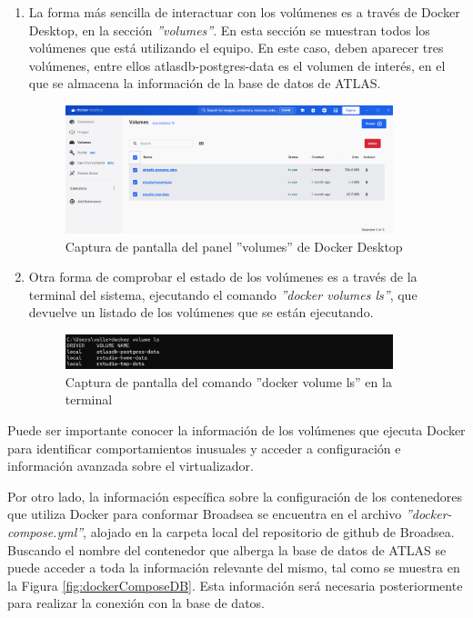 \documentclass{article}
\begin{document}
\begin{enumerate}

    \item La forma más sencilla de interactuar con los volúmenes es a través de Docker Desktop, en la sección \textit{''volumes''}. En esta sección se muestran todos los volúmenes que está utilizando el equipo. En este caso, deben aparecer tres volúmenes, entre ellos atlasdb-postgres-data es el volumen de interés, en el que se almacena la información de la base de datos de ATLAS.

\begin{figure}[H]
    \centering
    \includegraphics[width=0.90\textwidth]{images/dockerVolumes.png}
     \caption{Captura de pantalla del panel ''volumes'' de Docker Desktop}
    \label{fig:dockerVolumes}
\end{figure}

    \item Otra forma de comprobar el estado de los volúmenes es a través de la terminal del sistema, ejecutando el comando \textit{''docker volumes ls''}, que devuelve un listado de los volúmenes que se están ejecutando.
    
\begin{figure}[H]
    \centering
    \includegraphics[width=0.90\textwidth]{images/dockerVolumesCDM.png}
     \caption{Captura de pantalla del comando ''docker volume ls'' en la terminal}
    \label{fig:dockerVolumesCDM}
\end{figure}
    
\end{enumerate}

Puede ser importante conocer la información de los volúmenes que ejecuta Docker para identificar comportamientos inusuales y acceder a configuración e información avanzada sobre el virtualizador. 

Por otro lado, la información específica sobre la configuración de los contenedores que utiliza Docker para conformar Broadsea se encuentra en el archivo \textit{''docker-compose.yml''}, alojado en la carpeta local del repositorio de github de Broadsea. Buscando el nombre del contenedor que alberga la base de datos de ATLAS se puede acceder a toda la información relevante del mismo, tal como se muestra en la Figura \ref{fig:dockerComposeDB}. Esta información será necesaria posteriormente para realizar la conexión con la base de datos.
\end{document}
